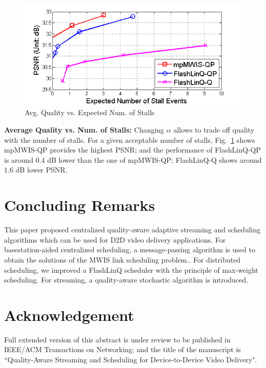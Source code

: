 \documentclass[journal]{IEEEtran}
\begin{document}
\begin{figure}[t!]
	\begin{center}
		\includegraphics[scale=0.4]{avgPNSR_pb8_2.png}
	\end{center}
	\caption{Avg. Quality vs. Expected Num. of Stalls}
	\label{fig:stall2}
\end{figure}




\textbf{Average Quality vs. Num. of Stalls:}
Changing $\alpha$ allows to trade off quality with the number of stalls. For a given acceptable number of stalls,
Fig.~\ref{fig:stall2} shows mpMWIS-QP provides the highest PSNR; and the performance of FlashLinQ-QP is around $0.4$ dB lower than the one of mpMWIS-QP; FlashLinQ-Q shows around $1.6$ dB lower PSNR.

 \vspace{-1.0mm}
\section{Concluding Remarks}\label{sec:conclusion}
This paper proposed centralized quality-aware adaptive streaming and scheduling algorithms which can be used for D2D video delivery applications.
For basestation-aided centralized scheduling, a message-passing algorithm is used to obtain the solutions of the MWIS link scheduling problem..
For distributed scheduling, we improved a FlashLinQ scheduler with the principle of max-weight scheduling.
For streaming, a quality-aware stochastic algorithm is introduced.

 \vspace{-1.0mm}
\section*{Acknowledgement}\label{sec:conclusion}
Full extended version of this abstract is under review to be published in IEEE/ACM Transactions on Networking; and the title of the manuscript is ``Quality-Aware Streaming and Scheduling for Device-to-Device Video Delivery".
\end{document}
